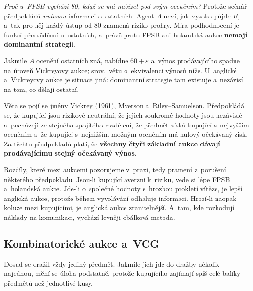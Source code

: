 \documentclass[11pt,a4paper]{article}
\theoremstyle{definition}
\begin{document}
\emph{Proč u~FPSB vychází 80, když se má nabízet pod svým oceněním?} Protože scénář předpokládá
\emph{nulovou} informaci o~ostatních. Agent $A$ neví, jak vysoko půjde $B$, a~tak pro něj každý
ústup od 80 znamená riziko prohry. Míra podhodnocení je funkcí přesvědčení o~ostatních, a~právě
proto FPSB ani holandská aukce \textbf{nemají dominantní strategii}.

Jakmile $A$ ocenění ostatních zná, nabídne $60+\varepsilon$ a~výnos prodávajícího spadne na
úroveň Vickreyovy aukce; srov.\ větu o~ekvivalenci výnosů níže. U~anglické a~Vickreyovy aukce je
situace jiná: dominantní strategie tam existuje a~nezávisí na tom, co dělají ostatní.

\begin{defbox}
Věta se pojí se jmény Vickrey (1961), Myerson a~Riley--Samuelson. Předpokládá se, že kupující
jsou rizikově neutrální, že jejich soukromé hodnoty jsou nezávislé a~pocházejí ze stejného
spojitého rozdělení, že předmět získá kupující s~nejvyšším oceněním a~že kupující s~nejnižším
možným oceněním má nulový očekávaný zisk. Za těchto předpokladů platí, že
\textbf{všechny čtyři základní aukce dávají prodávajícímu stejný očekávaný výnos.}

Rozdíly, které mezi aukcemi pozorujeme v~praxi, tedy pramení z~porušení některého předpokladu.
Jsou-li kupující averzní k~riziku, vede si lépe FPSB a~holandská aukce. Jde-li o~společné hodnoty
s~hrozbou prokletí vítěze, je lepší anglická aukce, protože během vyvolávání odhaluje informaci.
Hrozí-li naopak koluze mezi kupujícími, je anglická aukce zranitelnější. A~tam, kde rozhodují
náklady na komunikaci, vychází levněji obálková metoda.
\end{defbox}
\subsection{Kombinatorické aukce a~VCG}

Dosud se dražil vždy jediný předmět. Jakmile jich jde do dražby několik najednou, mění se úloha
podstatně, protože kupujícího zajímají spíš celé balíky předmětů než jednotlivé kusy.
\end{document}
